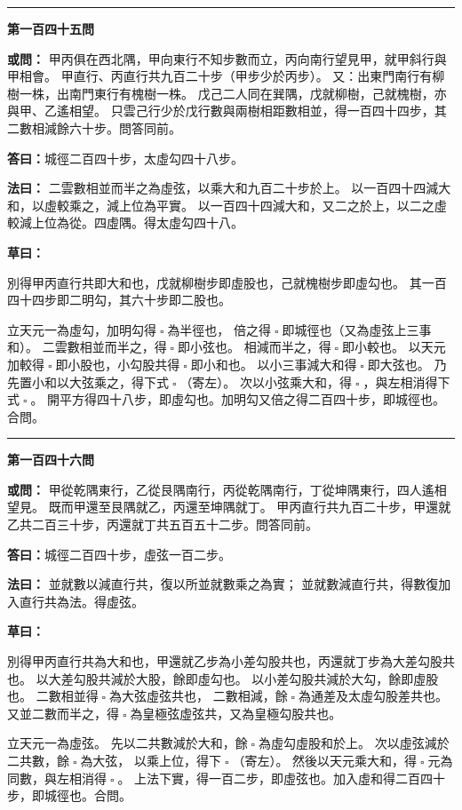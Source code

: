\documentclass[11pt,a4paper]{article}
\let\origsquare\square
\renewcommand{\square}{\ensuremath{\origsquare}}%
\newcommand{\longline}{\noindent\rule{\textwidth}{0.4pt}}
\newcommand{\owen}[1]{%
  \par\vspace{0.4em}%
  \noindent\textcolor{problemcolor}{\textbf{或問：}}{\tradfont #1}\par\nopagebreak%
}
\newcommand{\fayue}[1]{%
  \par\noindent\textcolor{methodcolor}{\textbf{法曰：}}{\tradfont #1}\par\nopagebreak%
}
\newcommand{\tsaoyue}[1]{%
  \par\noindent\textcolor{workcolor}{\textbf{草曰：}}{\tradfont #1}\par%
}
\newcommand{\dayue}[1]{%
  \par\noindent\textcolor{anscolor}{\textbf{答曰：}}{\tradfont #1}\par\nopagebreak%
}
\newcommand{\wen}[1]{\par\vspace{0.3em}\noindent\textcolor{problemcolor}{\textbf{第#1問}}\par}
\begin{document}
\vspace{0.5cm}
\begin{center}
\longline
\end{center}

\wen{一百四十五}
\owen{%
甲丙俱在西北隅，甲向東行不知步數而立，丙向南行望見甲，就甲斜行與甲相會。
甲直行、丙直行共九百二十步（甲步少於丙步）。
又：出東門南行有柳樹一株，出南門東行有槐樹一株。
戊己二人同在巽隅，戊就柳樹，己就槐樹，亦與甲、乙遙相望。
只雲己行少於戊行數與兩樹相距數相並，得一百四十四步，其二數相減餘六十步。問答同前。}
\dayue{城徑二百四十步，太虛勾四十八步。}

\fayue{%
二雲數相並而半之為虛弦，以乘大和九百二十步於上。
以一百四十四減大和，以虛較乘之，減上位為平實。
以一百四十四減大和，又二之於上，以二之虛較減上位為從。四虛隅。得太虛勾四十八。}

\tsaoyue{%
別得甲丙直行共即大和也，戊就柳樹步即虛股也，己就槐樹步即虛勾也。
其一百四十四步即二明勾，其六十步即二股也。

立天元一為虛勾，加明勾得$ \; \square \; $為半徑也，
倍之得$ \; \square \; $即城徑也（又為虛弦上三事和）。
二雲數相並而半之，得$ \; \square \; $即小弦也。
相減而半之，得$ \; \square \; $即小較也。
以天元加較得$ \; \square \; $即小股也，小勾股共得$ \; \square \; $即小和也。
以小三事減大和得$ \; \square \; $即大弦也。
乃先置小和以大弦乘之，得下式$ \; \square \; $（寄左）。
次以小弦乘大和，得$ \; \square \; $，與左相消得下式$ \; \square \; $。
開平方得四十八步，即虛勾也。加明勾又倍之得二百四十步，即城徑也。合問。}

\vspace{0.5cm}
\begin{center}
\longline
\end{center}

\wen{一百四十六}
\owen{%
甲從乾隅東行，乙從艮隅南行，丙從乾隅南行，丁從坤隅東行，四人遙相望見。
既而甲還至艮隅就乙，丙還至坤隅就丁。
甲丙直行共九百二十步，甲還就乙共二百三十步，丙還就丁共五百五十二步。問答同前。}
\dayue{城徑二百四十步，虛弦一百二步。}

\fayue{%
並就數以減直行共，復以所並就數乘之為實；
並就數減直行共，得數復加入直行共為法。得虛弦。}

\tsaoyue{%
別得甲丙直行共為大和也，甲還就乙步為小差勾股共也，丙還就丁步為大差勾股共也。
以大差勾股共減於大股，餘即虛勾也。
以小差勾股共減於大勾，餘即虛股也。
二數相並得$ \; \square \; $為大弦虛弦共也，
二數相減，餘$ \; \square \; $為通差及太虛勾股差共也。
又並二數而半之，得$ \; \square \; $為皇極弦虛弦共，又為皇極勾股共也。

立天元一為虛弦。
先以二共數減於大和，餘$ \; \square \; $為虛勾虛股和於上。
次以虛弦減於二共數，餘$ \; \square \; $為大弦，
以乘上位，得下$ \; \square \; $（寄左）。
然後以天元乘大和，得$ \; \square \; $元為同數，與左相消得$ \; \square \; $。
上法下實，得一百二步，即虛弦也。加入虛和得二百四十步，即城徑也。合問。}
\end{document}
